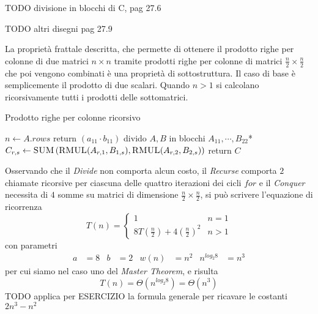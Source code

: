 TODO divisione in blocchi di C, pag 27.6

TODO altri disegni pag 27.9

La proprietà frattale descritta, che permette di ottenere il prodotto righe per colonne di due matrici $n \times n$ tramite prodotti righe per colonne di matrici $\frac{n}{2} \times \frac{n}{2}$ che poi vengono combinati è una proprietà di sottostruttura. Il caso di base è semplicemente il prodotto di due scalari. Quando $n>1$ si calcolano ricorsivamente tutti i prodotti delle sottomatrici.

\begin{algorithm}[H]
\caption{Prodotto righe per colonne ricorsivo}\label{alg:mulrcric}
\begin{algorithmic}[1]
    \State $n \gets A.rows$
                                 
        \State return $\left( a_{11} \cdot b_{11} \right)$
    \EndIf
    \State *divido $A, B$ in blocchi $A_{11}, \cdots, B_{22}$*    
                                        
        \State $C_{r,s} \gets 
        \Call{SUM}{}
        \left(
            \Call{RMUL}{A_{r,1}, B_{1,s}}, 
            \Call{RMUL}{A_{r,2}, B_{2,s}} 
        \right)
        $
        \EndFor
    \EndFor
    \State return $C$
    \EndProcedure
\end{algorithmic}
\end{algorithm}
Osservando che il \textit{Divide} non comporta alcun costo, il \textit{Recurse} comporta $2$ chiamate ricorsive per ciascuna delle quattro iterazioni dei cicli $for$ e il \textit{Conquer} necessita di $4$ somme su matrici di dimensione $\frac{n}{2} \times \frac{n}{2}$, si può scrivere l'equazione di ricorrenza
\begin{equation}
    T(n) = 
    \begin{cases}
        1 & n=1 \\
        8 T \left( \frac{n}{2} \right) + 4 \left( \frac{n}{2} \right)^2 & n>1
    \end{cases}
    \label{eq:rcric}
\end{equation}
con parametri
\begin{align*}
    a&=8 & b&=2 & w(n)&=n^2 & n^{log_2 8}&=n^3
\end{align*}
per cui siamo nel caso uno del \textit{Master Theorem}, e risulta
\begin{equation*}
    T(n) = \Theta\left( n^{log_2 8} \right) = \Theta\left( n^{3} \right)  
\end{equation*}
TODO applica per ESERCIZIO la formula generale per ricavare le costanti $2n^3-n^2$

